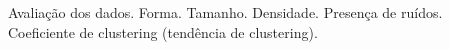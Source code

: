 
Avaliação dos dados.
  Forma.
  Tamanho.
  Densidade.
  Presença de ruídos.
  Coeficiente de clustering (tendência de clustering).
